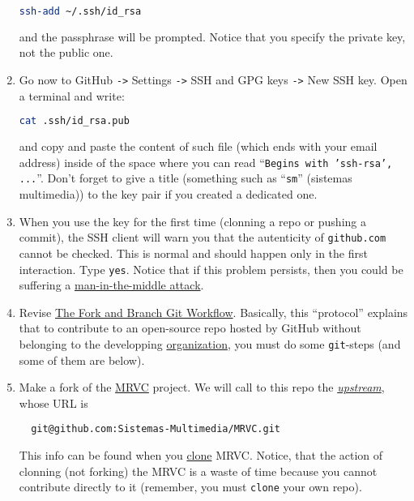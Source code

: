 \begin{enumerate}
  \begin{lstlisting}[language=bash]  
    ssh-add ~/.ssh/id_rsa
  \end{lstlisting}

  and the passphrase will be prompted. Notice that you specify the
  private key, not the public one.
  
\item Go now to GitHub \texttt{->} Settings \texttt{->} SSH and GPG
  keys \texttt{->} New SSH key. Open a terminal and write:
  
  \begin{lstlisting}[language=bash]  
    cat .ssh/id_rsa.pub
  \end{lstlisting}

  and copy and paste the content of such file (which ends with your
  email address) inside of the space where you can read
  ``\texttt{Begins with 'ssh-rsa', ...}''. Don't forget to give a
  title (something such as ``\texttt{sm}'' (sistemas multimedia))
  to the key pair if you created a dedicated one.
  
\item When you use the key for the first time (clonning a repo or
  pushing a commit), the SSH client will warn you that the autenticity
  of \texttt{github.com} cannot be checked. This is normal and should
  happen only in the first interaction. Type \texttt{yes}. Notice that
  if this problem persists, then you could be suffering a
  \href{https://en.wikipedia.org/wiki/Man-in-the-middle_attack}{man-in-the-middle
    attack}.

\item Revise
  \href{https://github.com/vicente-gonzalez-ruiz/fork_and_branch_git_workflow}{The
    Fork and Branch Git Workflow}. Basically, this ``protocol''
  explains that to contribute to an open-source repo hosted by GitHub
  without belonging to the developping
  \href{https://docs.github.com/en/organizations/collaborating-with-groups-in-organizations/about-organizations}{organization},
  you must do some \texttt{git}-steps (and some of them are below).

\item Make a fork of the
  \href{https://github.com/Sistemas-Multimedia/MRVC}{MRVC}
  project. We will call to this repo the
  \href{https://docs.github.com/en/github/getting-started-with-github/github-glossary#upstream}{\emph{upstream}}, whose URL is
\begin{verbatim}
  git@github.com:Sistemas-Multimedia/MRVC.git
\end{verbatim}        
  This info can be found when you
  \href{https://docs.github.com/en/github/creating-cloning-and-archiving-repositories/cloning-a-repository}{clone}
  MRVC. Notice, that the action of clonning (not forking) the MRVC is a waste of
  time because you cannot contribute directly to it (remember, you
  must \texttt{clone} your own repo).


\end{enumerate}
